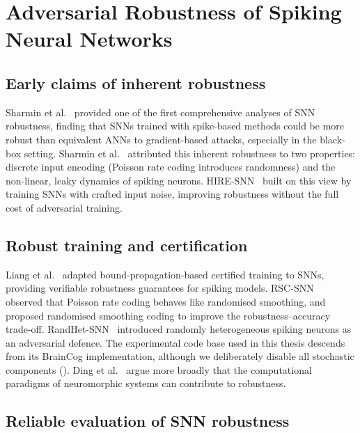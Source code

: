 \section{Adversarial Robustness of Spiking Neural Networks}
\label{sec:rw-snn-robust}

\subsection{Early claims of inherent robustness}

Sharmin et al.~\cite{sharmin2019comprehensive} provided one of the first comprehensive analyses of SNN robustness, finding that SNNs trained with spike-based methods could be more robust than equivalent ANNs to gradient-based attacks, especially in the black-box setting. Sharmin et al.~\cite{sharmin2020inherent} attributed this inherent robustness to two properties: discrete input encoding (Poisson rate coding introduces randomness) and the non-linear, leaky dynamics of spiking neurons. HIRE-SNN~\cite{kundu2021hire} built on this view by training SNNs with crafted input noise, improving robustness without the full cost of adversarial training.

\subsection{Robust training and certification}

Liang et al.~\cite{liang2022toward} adapted bound-propagation-based certified training to SNNs, providing verifiable robustness guarantees for spiking models. RSC-SNN~\cite{wu2024rsc} observed that Poisson rate coding behaves like randomised smoothing, and proposed randomised smoothing coding to improve the robustness--accuracy trade-off. RandHet-SNN~\cite{wang2025random} introduced randomly heterogeneous spiking neurons as an adversarial defence. The experimental code base used in this thesis descends from its BrainCog implementation, although we deliberately disable all stochastic components (). Ding et al.~\cite{ding2025neuromorphic} argue more broadly that the computational paradigms of neuromorphic systems can contribute to robustness.

\subsection{Reliable evaluation of SNN robustness}

